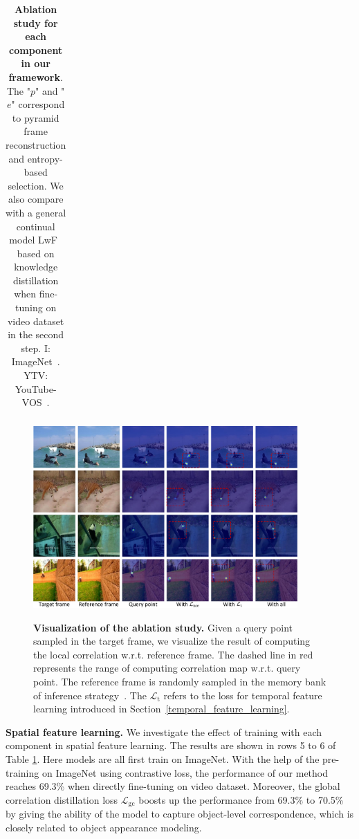 \documentclass{article}
\begin{document}
\begin{table}[t]
{\begin{tabular}{cc|cccc|c|ccc}
        \hline
      \end{tabular}%
      }
    \captionsetup{font=small}
    \caption{\textbf{Ablation study for each component in our framework}.  The "$p$" and "$e$" correspond to pyramid frame reconstruction and entropy-based selection. We also compare with a general continual model LwF~\cite{li2017learning} based on knowledge distillation when fine-tuning on video dataset in the second step. I: ImageNet~\cite{deng2009imagenet}.  YTV: YouTube-VOS~\cite{xu2018youtube}.}
    \label{tab:ablations}\vspace{-4mm}
\end{table}

\begin{figure}[!tb]
  \centering
  {\includegraphics[width=0.9\textwidth]{figure/abalations/ablataions.pdf}}
  \caption{\small \textbf{Visualization of the ablation study.} Given a query point sampled in the target frame, we visualize the result of computing the local correlation  w.r.t. reference frame. The dashed line in red represents the range of computing correlation map w.r.t. query point. The reference frame is randomly sampled in the memory bank of inference strategy~\cite{jabri2020space}\cite{lai2020mast}\cite{xu2021rethinking}. The $\mathcal{L}_{\mathrm{t}}$ refers to the loss for temporal feature learning introduced in Section~\ref{temporal_feature_learning}.}
  \label{fig:ablations}
  \vspace{-7mm}
\end{figure}

\textbf{Spatial feature learning.} We investigate the effect of training with each component in spatial feature learning. The results are shown in rows 5 to 6 of Table \ref{tab:ablations}. Here models are all first train on ImageNet. With the help of the pre-training on ImageNet using contrastive loss, the performance of our method reaches 69.3\%  when directly fine-tuning on video dataset. Moreover, the global correlation distillation loss $\mathcal{L}_{\mathrm{gc}}$ boosts up the performance from 69.3\% to 70.5\% by giving the ability of the model to capture object-level correspondence, which is closely related to object appearance modeling.
 
\end{document}
